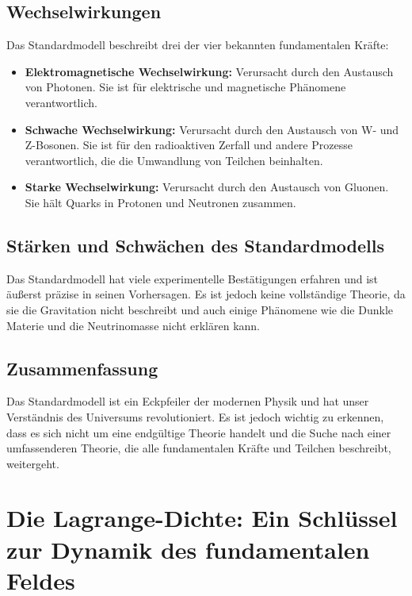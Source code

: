 \documentclass{article}
\begin{document}
	\subsection{Wechselwirkungen}
	
	Das Standardmodell beschreibt drei der vier bekannten fundamentalen Kräfte:
	
	\begin{itemize}
		\item \textbf{Elektromagnetische Wechselwirkung:} Verursacht durch den Austausch von Photonen. Sie ist für elektrische und magnetische Phänomene verantwortlich.
		\item \textbf{Schwache Wechselwirkung:} Verursacht durch den Austausch von W- und Z-Bosonen. Sie ist für den radioaktiven Zerfall und andere Prozesse verantwortlich, die die Umwandlung von Teilchen beinhalten.
		\item \textbf{Starke Wechselwirkung:} Verursacht durch den Austausch von Gluonen. Sie hält Quarks in Protonen und Neutronen zusammen.
	\end{itemize}
	
	\subsection{Stärken und Schwächen des Standardmodells}
	
	Das Standardmodell hat viele experimentelle Bestätigungen erfahren und ist äußerst präzise in seinen Vorhersagen. Es ist jedoch keine vollständige Theorie, da sie die Gravitation nicht beschreibt und auch einige Phänomene wie die Dunkle Materie und die Neutrinomasse nicht erklären kann.
	
	\subsection{Zusammenfassung}
	
	Das Standardmodell ist ein Eckpfeiler der modernen Physik und hat unser Verständnis des Universums revolutioniert. Es ist jedoch wichtig zu erkennen, dass es sich nicht um eine endgültige Theorie handelt und die Suche nach einer umfassenderen Theorie, die alle fundamentalen Kräfte und Teilchen beschreibt, weitergeht.
	
	\section{Die Lagrange-Dichte: Ein Schlüssel zur Dynamik des fundamentalen Feldes}
	
\end{document}
